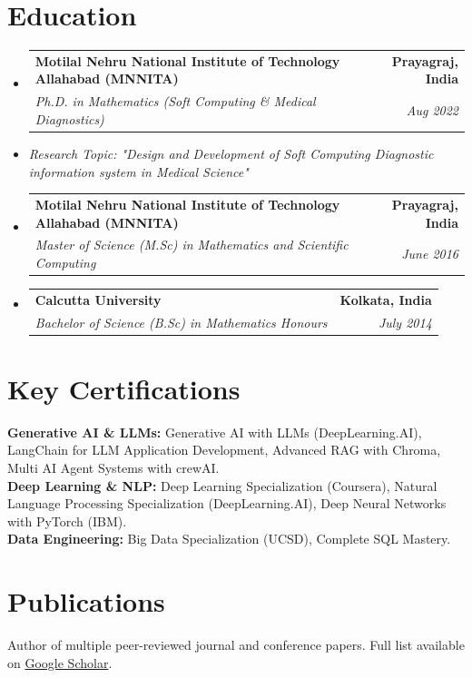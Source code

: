 \documentclass[a4paper,11pt]{article}
\makeatletter
\newcommand{\resumeItem}[1]{
  \item\small{
    {#1 \vspace{3pt}} %
  }
}
\newcommand{\resumeSubheading}[4]{
  \vspace{4pt}\item %
    \begin{tabular*}{0.99\textwidth}[t]{l@{\extracolsep{\fill}}r}
      \textbf{#1} & \textbf{\small #2} \\
      \textit{\small#3} & \textit{\small #4} \\
    \end{tabular*}\vspace{-5pt}
}
\newcommand{\resumeSubHeadingListStart}{\begin{itemize}[leftmargin=0.15in, label={}]}
\newcommand{\resumeSubHeadingListEnd}{\end{itemize}}
\makeatother
\begin{document}
\section{Education}
  \resumeSubHeadingListStart
    \resumeSubheading
      {Motilal Nehru National Institute of Technology Allahabad (MNNITA)}{Prayagraj, India}
      {Ph.D. in Mathematics (Soft Computing \& Medical Diagnostics)}{Aug 2022}
      \resumeItem{\textit{Research Topic: "Design and Development of Soft Computing Diagnostic information system in Medical Science"}}
    \resumeSubheading
      {Motilal Nehru National Institute of Technology Allahabad (MNNITA)}{Prayagraj, India}
      {Master of Science (M.Sc) in Mathematics and Scientific Computing}{June 2016}
    \resumeSubheading
      {Calcutta University}{Kolkata, India}
      {Bachelor of Science (B.Sc) in Mathematics Honours}{July 2014}
  \resumeSubHeadingListEnd


\section{Key Certifications}
\vspace{2pt}
 \begin{itemize}[leftmargin=0.15in, label={}]
    \small{\item{
     \textbf{Generative AI \& LLMs:} Generative AI with LLMs (DeepLearning.AI), LangChain for LLM Application Development, Advanced RAG with Chroma, Multi AI Agent Systems with crewAI. \\ \vspace{3pt}
     \textbf{Deep Learning \& NLP:} Deep Learning Specialization (Coursera), Natural Language Processing Specialization (DeepLearning.AI), Deep Neural Networks with PyTorch (IBM). \\ \vspace{3pt}
     \textbf{Data Engineering:} Big Data Specialization (UCSD), Complete SQL Mastery.
    }}
 \end{itemize}


\section{Publications}
\vspace{2pt}
\small{Author of multiple peer-reviewed journal and conference papers. 
Full list available on 
\href{https://scholar.google.com/citations?user=e0y5D-cAAAAJ}{Google Scholar}.}
\end{document}
